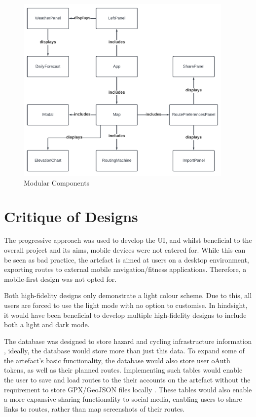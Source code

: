 \begin{figure}[!ht]
  \centering
  \includegraphics[width=400px]{figures/components.pdf}
  \caption{Modular Components}
  \label{fig:components}
\end{figure}

\clearpage 
\section{Critique of Designs}
\label{design:critique}

The progressive approach was used to develop the UI, and whilst beneficial to the overall project and its aims, mobile devices were not catered for. While this can be seen as bad practice, the artefact is aimed at users on a desktop environment, exporting routes to external mobile navigation/fitness applications. Therefore, a mobile-first design was not opted for.

Both high-fidelity designs  only demonstrate a light colour scheme. Due to this, all users are forced to use the light mode with no option to customise. In hindsight, it would have been beneficial to develop multiple high-fidelity designs to include both a light and dark mode.

The database was designed to store hazard and cycling infrastructure information , ideally, the database would store more than just this data. To expand some of the artefact's basic functionality, the database would also store user oAuth tokens, as well as their planned routes. Implementing such tables would enable the user to save and load routes to the their accounts on the artefact without the requirement to store GPX/GeoJSON files locally . These tables would also enable a more expansive sharing functionality to social media, enabling users to share links to routes, rather than map screenshots of their routes.

